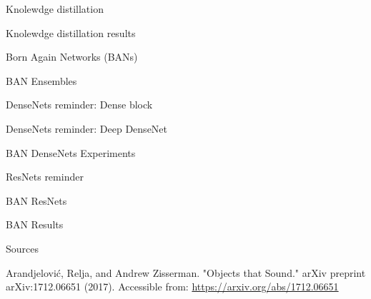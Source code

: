 \documentclass{beamer}
\begin{document}
\begin{frame}{Knolewdge distillation}




\end{frame}

\begin{frame}{Knolewdge distillation results}


\end{frame}
\begin{frame}{Born Again Networks (BANs)}


\end{frame}
\begin{frame}{BAN Ensembles}

 

\end{frame}
\begin{frame}{DenseNets reminder: Dense block }


\end{frame}
\begin{frame}{DenseNets reminder: Deep DenseNet }


\end{frame}
\begin{frame}{BAN DenseNets Experiments }



\end{frame}
\begin{frame}{ResNets reminder}

\end{frame}
\begin{frame}{BAN ResNets}

\end{frame}
\begin{frame}{BAN Results}


\end{frame}

\begin{frame}{Sources}

\begin{thebibliography}{0}

   Arandjelović, Relja, and Andrew Zisserman. "Objects that Sound." arXiv preprint arXiv:1712.06651 (2017). Accessible from: \url{https://arxiv.org/abs/1712.06651}
  
\end{thebibliography}
\end{frame}
 
 
 
\end{document}
